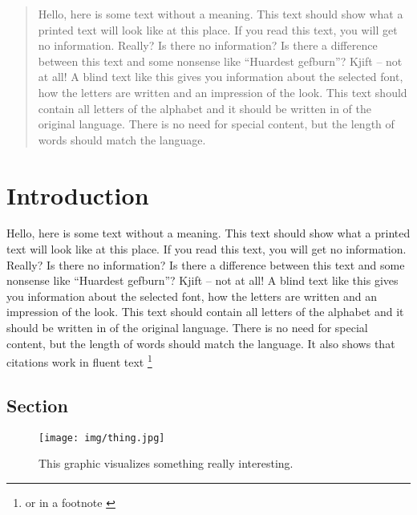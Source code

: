 \documentclass{DESSThesis}
\begin{document}
\def \TypeofThesis{Master Thesis}
\def \TitleofThesis{Something interesting and meaningful}
\def \AuthorofThesis{Your Name}
\def \FirstSupervisor{Your first Supervisor}
\def \SecondSupervisor{Your second Supervisor}
\def \Advisor{Advisor}

\newpage
\thispagestyle{plain}
\begin{abstract}
	Hello, here is some text without a meaning. This text should show what a printed text will look like
at this place. If you read this text, you will get no information. Really? Is there no information?
Is there a difference between this text and some nonsense like “Huardest gefburn”? Kjift – not at
all! A blind text like this gives you information about the selected font, how the letters are written
and an impression of the look. This text should contain all letters of the alphabet and it should be
written in of the original language. There is no need for special content, but the length of words
should match the language.
\end{abstract}
\cleardoublepage
{} %
\chapter{Introduction}
\thispagestyle{empty}
Hello, here is some text without a meaning. This text should show what a printed text will look like
at this place. If you read this text, you will get no information. Really? Is there no information?
Is there a difference between this text and some nonsense like “Huardest gefburn”? Kjift – not at
all! A blind text like this gives you information about the selected font, how the letters are written
and an impression of the look. This text should contain all letters of the alphabet and it should be
written in of the original language. There is no need for special content, but the length of words
should match the language.
It also shows that citations work in fluent text \cite{lit:koblergraphisomorphism}
\footnote{or in a footnote \cite{groheparameterized}}
\section{Section}
\begin{figure}[htb!]
	\centering
	\texttt{[image: img/thing.jpg]}
	\caption{This graphic visualizes something really interesting.}
	\label{fig:dummy}
  \end{figure}
\end{document}
